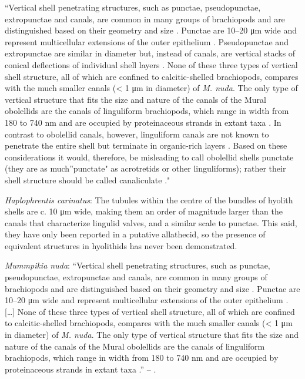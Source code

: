\documentclass[]{book}
\theoremstyle{definition}
\theoremstyle{definition}
\theoremstyle{definition}
\theoremstyle{remark}
\begin{document}
``Vertical shell penetrating structures, such as punctae, pseudopunctae,
extropunctae and canals, are common in many groups of brachiopods and
are distinguished based on their geometry and size
\citep{Williams1997BrachiopodaRevised}. Punctae are 10--20 μm wide and
represent multicellular extensions of the outer epithelium
\citep{Owen1969Thecaecum}. Pseudopunctae and extropunctae are similar in
diameter but, instead of canals, are vertical stacks of conical
deflections of individual shell layers \citep{Williams1993Roleof}. None
of these three types of vertical shell structure, all of which are
confined to calcitic-shelled brachiopods, compares with the much smaller
canals (\textless{} 1 μm in diameter) of \emph{M. nuda}. The only type
of vertical structure that fits the size and nature of the canals of the
Mural obolellids are the canals of linguliform brachiopods, which range
in width from 180 to 740 nm and are occupied by proteinaceous strands in
extant taxa
\citep{Williams1992Structureof, Williams1994Collagenouschitino, Williams1997BrachiopodaRevised}.
In contrast to obolellid canals, however, linguliform canals are not
known to penetrate the entire shell but terminate in organic-rich layers
\citep{Williams1997BrachiopodaRevised}. Based on these considerations it
would, therefore, be misleading to call obolellid shells punctate (they
are as much''punctate" as acrotretids or other linguliforms); rather
their shell structure should be called canaliculate
\citep{Williams1997BrachiopodaRevised}."

\emph{Haplophrentis carinatus}: The tubules within the centre of the
bundles of hyolith shells \citep{Kouchinsky2000Skeletalmicrostructures}
are c. 10 μm wide, making them an order of magnitude larger than the
canals that characterize lingulid valves, and a similar scale to
punctae. This said, they have only been reported in a putative
allathecid, so the presence of equivalent structures in hyolithids has
never been demonstrated.

\emph{Mummpikia nuda}: ``Vertical shell penetrating structures, such as
punctae, pseudopunctae, extropunctae and canals, are common in many
groups of brachiopods and are distinguished based on their geometry and
size \citep{Williams1997BrachiopodaRevised}. Punctae are 10--20 μm wide
and represent multicellular extensions of the outer epithelium
\citep{Owen1969Thecaecum}. {[}\ldots{}{]} None of these three types of
vertical shell structure, all of which are confined to calcitic-shelled
brachiopods, compares with the much smaller canals (\textless{} 1 μm in
diameter) of \emph{M. nuda}. The only type of vertical structure that
fits the size and nature of the canals of the Mural obolellids are the
canals of linguliform brachiopods, which range in width from 180 to 740
nm and are occupied by proteinaceous strands in extant taxa
\citetext{\citealp[1994]{Williams1992Structureof}; \citealp{Williams1997BrachiopodaRevised}}.''
-- \citet{Balthasar2008iMummpikia}.
\end{document}
